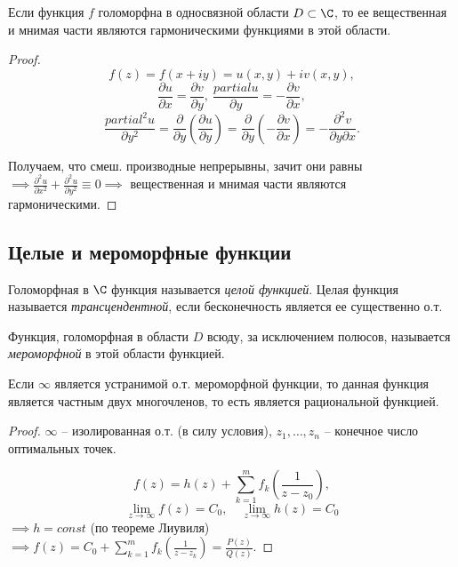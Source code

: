 \begin{theorem}
	Если функция $f$ голоморфна в односвязной области $D \subset \C$, то ее вещественная и мнимая части являются гармоническими функциями в этой области.
\end{theorem}

\begin{proof}
	\[
		f(z) = f(x + iy) = u(x,y) + iv(x,y),
	\]
	\[
		\frac{\partial u}{\partial x} = \frac{\partial v}{\partial y} , \ \frac{partial u}{\partial y} = - \frac{\partial v}{\partial x},
	\]
	\[
		\frac{partial^2 u}{\partial y^2}  = \frac{\partial}{\partial y} \left(\frac{\partial u}{\partial y} \right) = \frac{\partial}{\partial y} \left(-\frac{\partial v}{\partial x} \right) = - \frac{\partial^2 v}{\partial y \partial x} .
	\]

	Получаем, что смеш. производные непрерывны, зачит они равны $\implies \frac{\partial^2u}{\partial x^2} + \frac{\partial^2u}{\partial y^2} \equiv 0 \implies $ вещественная и мнимая части являются гармоническими.
\end{proof}

\subsection{Целые и мероморфные функции}

\begin{definition}
	Голоморфная в $\C$ функция называется \emph{целой функцией}. Целая функция называется \emph{трансцендентной}, если бесконечность является ее существенно о.т.
\end{definition}

\begin{definition}
	Функция, голоморфная в области $D$ всюду, за исключением полюсов, называется \emph{мероморфной} в этой области функцией.
\end{definition}

\begin{theorem}
	Если $\infty $ является устранимой о.т. мероморфной функции, то данная функция является частным двух многочленов, то есть является рациональной функцией.
\end{theorem}

\begin{proof}
	$\infty $ -- изолированная о.т. (в силу условия), $z_1,\ldots,z_n$ -- конечное число оптимальных точек.

	\[
		f(z) = h(z) + \sum_{k=1}^{m} f_k \left(\frac{1}{z - z_0} \right),
	\]
	\[
		\underset{z \rightarrow \infty }{\lim} f(z) = C_0, \quad \underset{z \rightarrow \infty }{\lim} h(z) = C_0
	\]
	$\implies h = const$ (по теореме Лиувиля) $\implies f(z) = C_0 + \sum_{k=1}^{m} f_k \left(\frac{1}{z-z_k} \right) = \frac{P(z)}{Q(z)} $.
\end{proof}
